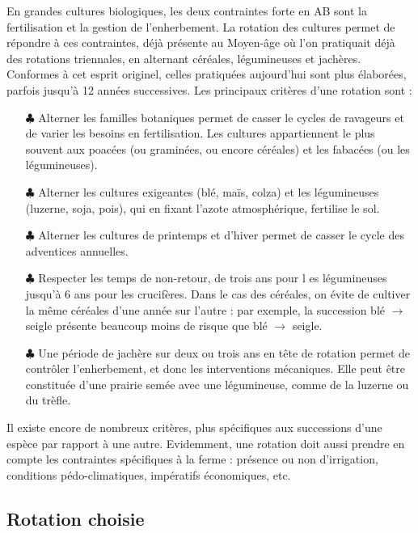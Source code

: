 \documentclass{book}
\begin{document}
En grandes cultures biologiques, les deux contraintes forte en AB sont la fertilisation et la gestion de l'enherbement. La rotation des cultures permet de répondre à ces contraintes, déjà présente au Moyen-âge où l'on pratiquait déjà des rotations triennales, en alternant céréales, légumineuses et jachères. Conformes à cet esprit originel, celles pratiquées aujourd'hui sont plus élaborées, parfois jusqu'à 12 années successives. Les principaux critères d'une rotation sont :
\begin{itemize}

	\item[$\clubsuit$] Alterner les familles botaniques permet de casser le cycles de ravageurs et de varier les besoins en fertilisation. Les cultures appartiennent le plus souvent aux poacées (ou graminées, ou encore céréales) et les fabacées (ou les légumineuses). 

	\item[$\clubsuit$] Alterner les cultures exigeantes (blé, maïs, colza) et les légumineuses (luzerne, soja, pois), qui en fixant l'azote atmosphérique, fertilise le sol. 
	
	\item[$\clubsuit$] Alterner les cultures de printemps et d'hiver permet de casser le cycle des adventices annuelles.
	
	\item[$\clubsuit$] Respecter les temps de non-retour, de trois ans pour l es légumineuses jusqu'à 6 ans pour les crucifères. Dans le cas des céréales, on évite de cultiver la même céréales d'une année sur l'autre : par exemple, la succession blé $\rightarrow$ seigle présente beaucoup moins de risque que blé $\rightarrow$ seigle.
	
	\item[$\clubsuit$] Une période de jachère sur deux ou trois ans en tête de rotation permet de contrôler l'enherbement, et donc les interventions mécaniques. Elle peut être constituée d'une prairie semée avec une légumineuse, comme de la luzerne ou du trèfle.

\end{itemize}

Il existe encore de nombreux critères, plus spécifiques aux successions d'une espèce par rapport à une autre. Evidemment, une rotation doit aussi prendre en compte les contraintes spécifiques à la ferme : présence ou non d'irrigation, conditions pédo-climatiques, impératifs économiques, etc.

\subsection{Rotation choisie}
\end{document}
